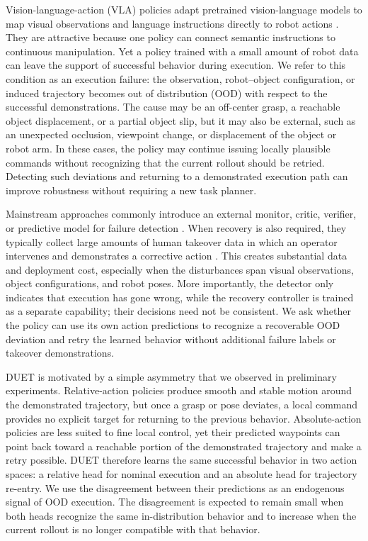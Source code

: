 \documentclass[letterpaper, 10 pt, conference]{ieeeconf}
\begin{document}
Vision-language-action (VLA) policies adapt pretrained vision-language models to map visual observations and language instructions directly to robot actions \cite{rt2,openvla,starvla}. They are attractive because one policy can connect semantic instructions to continuous manipulation. Yet a policy trained with a small amount of robot data can leave the support of successful behavior during execution. We refer to this condition as an execution failure: the observation, robot--object configuration, or induced trajectory becomes out of distribution (OOD) with respect to the successful demonstrations. The cause may be an off-center grasp, a reachable object displacement, or a partial object slip, but it may also be external, such as an unexpected occlusion, viewpoint change, or displacement of the object or robot arm. In these cases, the policy may continue issuing locally plausible commands without recognizing that the current rollout should be retried. Detecting such deviations and returning to a demonstrated execution path can improve robustness without requiring a new task planner.

Mainstream approaches commonly introduce an external monitor, critic, verifier, or predictive model for failure detection \cite{faildetect}. When recovery is also required, they typically collect large amounts of human takeover data in which an operator intervenes and demonstrates a corrective action \cite{dagger,sirius,intervengen}. This creates substantial data and deployment cost, especially when the disturbances span visual observations, object configurations, and robot poses. More importantly, the detector only indicates that execution has gone wrong, while the recovery controller is trained as a separate capability; their decisions need not be consistent. We ask whether the policy can use its own action predictions to recognize a recoverable OOD deviation and retry the learned behavior without additional failure labels or takeover demonstrations.

DUET is motivated by a simple asymmetry that we observed in preliminary experiments. Relative-action policies produce smooth and stable motion around the demonstrated trajectory, but once a grasp or pose deviates, a local command provides no explicit target for returning to the previous behavior. Absolute-action policies are less suited to fine local control, yet their predicted waypoints can point back toward a reachable portion of the demonstrated trajectory and make a retry possible. DUET therefore learns the same successful behavior in two action spaces: a relative head for nominal execution and an absolute head for trajectory re-entry. We use the disagreement between their predictions as an endogenous signal of OOD execution. The disagreement is expected to remain small when both heads recognize the same in-distribution behavior and to increase when the current rollout is no longer compatible with that behavior.
\end{document}
